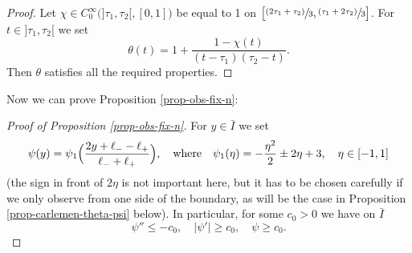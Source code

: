 \documentclass[10pt]{amsart}
\newcommand{\psfrac}[2]{\sfrac{(#1)}{#2}}
\theoremstyle{plain}
\theoremstyle{definition}
\newcommand{\abs}[1]{\vert #1\vert}
\newcommand{\1}{\mathds 1}
\begin{document}
\begin{proof}
Let $\chi \in C_0^\infty \bigl(]\tau_1,\tau_2[,[0,1] \bigr)$ be equal to 1 on $\big[\psfrac{2\tau_1 + \tau_2}{3},\psfrac{\tau_1 + 2\tau_2}{3} \big]$. For $t \in{}]\tau_1,\tau_2[$ we set
\[
\theta (t) = 1 + \frac{1 - \chi(t)}{(t-\tau_1)(\tau_2-t)}.
\]
Then $\theta$ satisfies all the required properties.
\end{proof}

Now we can prove Proposition \ref{prop-obs-fix-n}:

\begin{proof}[Proof of Proposition \ref{prop-obs-fix-n}]
For $y \in \bar I$ we set
\[
\psi(y) = \psi_1 \Bigl(\frac {2y + \ell_- - \ell_+}{\ell_- + \ell_+} \Bigr), \quad \text{where} \quad \psi_1(\eta) = - \frac {\eta^2} 2 \pm 2 \eta + 3, \quad \eta\in[-1,1]
\]
(the sign in front of $2\eta$ is not important here, but it has to be chosen carefully if we only observe from one side of the boundary, as will be the case in Proposition \ref{prop-carlemen-theta-psi} below).
In particular, for some $c_0 > 0$ we have on $\bar I$
\begin{equation} \label{eq-prop-psi}
\psi'' \leq - c_0, \quad \abs{\psi'} \geq c_0, \quad \psi \geq c_0.
\end{equation}


\end{proof}
\end{document}
